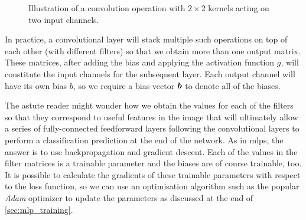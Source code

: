 \documentclass[../report.tex]{subfiles}
\begin{document}
\begin{figure}
    \caption[Illustration of a convolution operation acting on two input channels.]{Illustration of a convolution operation with $2\times 2$ kernels acting on two input channels.}
    \label{fig:conv_multiple_channels}
\end{figure}
In practice, a convolutional layer will stack multiple such operations on top of each other (with different filters) so that we obtain more than one output matrix.
These matrices, after adding the bias and applying the activation function $g$, will constitute the input channels for the subsequent layer.
Each output channel will have its own bias $b$, so we require a bias vector ${\bm{b}}$ to denote all of the biases.

The astute reader might wonder how we obtain the values for each of the filters so that they correspond to useful features in the image that will ultimately allow a series of fully-connected feedforward layers following the convolutional layers to perform a classification prediction at the end of the network.
As in \glspl{mlp}, the answer is to use backpropagation and gradient descent.
Each of the values in the filter matrices is a trainable parameter and the biases are of course trainable, too.
It is possible to calculate the gradients of these trainable parameters with respect to the loss function, so we can use an optimisation algorithm such as the popular \emph{Adam} optimizer \cite{kingma2017} to update the parameters as discussed at the end of \cref{sec:mlp_training}.
\end{document}
